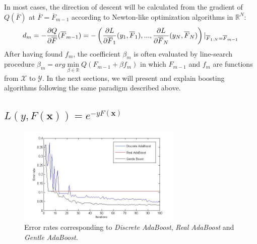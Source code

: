 \documentclass[a4paper,twoside,12pt]{article}
\begin{document}
\begin{center}
\end{center}


In most cases, the direction of descent will be calculated from the gradient of $Q(\overline{F})$ at $\overline{F} = \overline{F}_{m-1}$ according to Newton-like optimization algorithms in $\mathbb{R}^N$:
\begin{align}
    d_m = -\dfrac{\partial Q}{\partial \overline{F}}(\overline{F}_{m-1}) = -\left( \dfrac{\partial L}{\partial \overline{F}_1}(y_1, \overline{F}_1), ..., \dfrac{\partial L}{\partial \overline{F}_N}(y_N, \overline{F}_N)\right) \vert_{\overline{F}_{1:N} = \overline{F}_{m-1}} \notag
\end{align}
After having found $f_m$, the coefficient $\beta_m$ is often evaluated by line-search procedure $\beta_m = arg\min\limits_{\beta \in \mathbb{R}} Q(F_{m-1}+\beta f_m)$ in which $F_{m-1}$ and $f_m$ are functions from $\mathcal{X}$ to $\mathcal{Y}$. In the next sections, we will present and explain boosting algorithms following the same paradigm described above.

\subsection{$L(y, F(\textbf{x})) = e^{-yF(\textbf{x})}$} \label{exp_loss_part}

\begin{figure}[ht]\centering
  	\includegraphics[width=0.7\textwidth]{loss_exp.jpg}
  	\caption{Error rates corresponding to \textsl{Discrete AdaBoost}, \textsl{Real AdaBoost} and \textsl{Gentle AdaBoost}.}
  	\label{loss_exp}
\end{figure}
\end{document}

